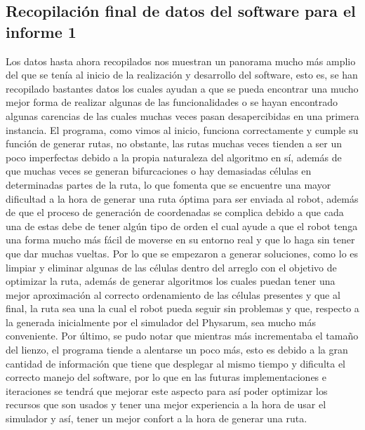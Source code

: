\subsection{Recopilaci\'on final de datos del software para el informe 1}
    Los datos hasta ahora recopilados nos muestran un panorama
        mucho m\'as amplio del que se ten\'ia al inicio de la realizaci\'on
        y desarrollo del software, esto es, se han recopilado
        bastantes datos los cuales ayudan a que se pueda encontrar
        una mucho mejor forma de realizar algunas de las
        funcionalidades o se hayan encontrado algunas carencias de
        las cuales muchas veces pasan desapercibidas en una
        primera instancia.
        \vskip 0.5cm
    El programa, como vimos al inicio, funciona correctamente
        y cumple su funci\'on de generar rutas, no obstante, las rutas
        muchas veces tienden a ser un poco imperfectas debido a la
        propia naturaleza del algoritmo en s\'i, adem\'as de que muchas
        veces se generan bifurcaciones o hay demasiadas c\'elulas en
        determinadas partes de la ruta, lo que fomenta que se
        encuentre una mayor dificultad a la hora de generar una ruta
        \'optima para ser enviada al robot, adem\'as de que el proceso
        de generaci\'on de coordenadas se complica debido a que cada
        una de estas debe de tener alg\'un tipo de orden el cual ayude
        a que el robot tenga una forma mucho m\'as f\'acil de moverse
        en su entorno real y que lo haga sin tener que dar muchas
        vueltas.
        \vskip 0.5cm
    Por lo que se empezaron a generar soluciones, como lo es
        limpiar y eliminar algunas de las c\'elulas dentro del arreglo
        con el objetivo de optimizar la ruta, adem\'as de generar
        algoritmos los cuales puedan tener una mejor aproximaci\'on
        al correcto ordenamiento de las c\'elulas presentes y que al
        final, la ruta sea una la cual el robot pueda seguir sin
        problemas y que, respecto a la generada inicialmente por el
        simulador del Physarum, sea mucho m\'as conveniente.
        Por \'ultimo, se pudo notar que mientras m\'as incrementaba el
        tama\~no del lienzo, el programa tiende a alentarse un poco
        m\'as, esto es debido a la gran cantidad de informaci\'on que
        tiene que desplegar al mismo tiempo y dificulta el correcto
        manejo del software, por lo que en las futuras
        implementaciones e iteraciones se tendr\'a que mejorar este
        aspecto para as\'i poder optimizar los recursos que son usados
        y tener una mejor experiencia a la hora de usar el simulador
        y as\'i, tener un mejor confort a la hora de generar una ruta.
        \vskip 0.5cm